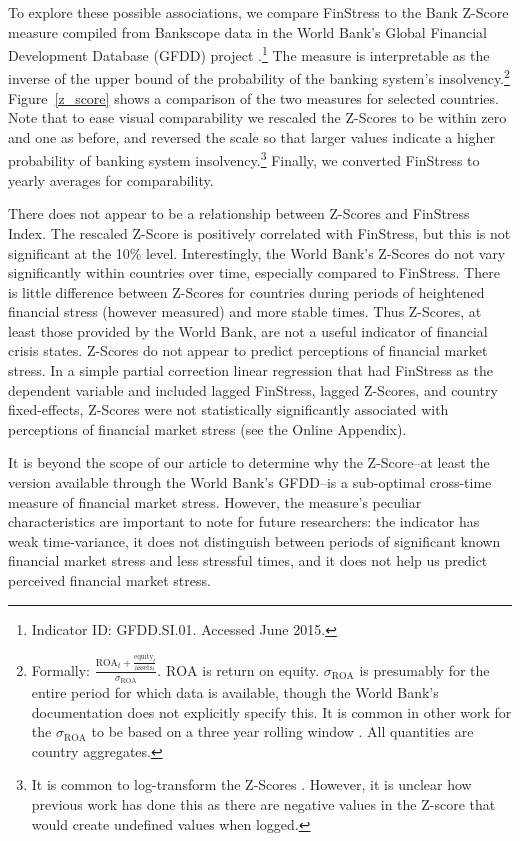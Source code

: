 \documentclass[]{article}
\begin{document}
To explore these possible associations, we compare FinStress to the Bank Z-Score measure compiled from Bankscope data in the World Bank's Global Financial Development Database (GFDD) project \citep{worldbank2013}.\footnote{Indicator ID: GFDD.SI.01. Accessed June 2015.} The measure is interpretable as the inverse of the upper bound of the probability of the banking system's insolvency.\footnote{Formally: $\frac{\mathrm{ROA}_{t} + \frac{\mathrm{equity}_{t}}{\mathrm{assets}_{t}}}{\sigma_{\mathrm{ROA}}}$. $\mathrm{ROA}$ is return on equity. $\sigma_{\mathrm{ROA}}$ is presumably for the entire period for which data is available, though the World Bank's documentation does not explicitly specify this. It is common in other work for the $\sigma_{\mathrm{ROA}}$ to be based on a three year rolling window \cite[225]{beck2013bank}. All quantities are country aggregates.} Figure~\ref{z_score} shows a comparison of the two measures for selected countries. Note that to ease visual comparability we rescaled the Z-Scores to be within zero and one as before, and reversed the scale so that larger values indicate a higher probability of banking system insolvency.\footnote{It is common to log-transform the Z-Scores \cite[225]{beck2013bank}. However, it is unclear how previous work has done this as there are negative values in the Z-score that would create undefined values when logged.} Finally, we converted FinStress to yearly averages for comparability.

There does not appear to be a relationship between Z-Scores and FinStress Index. The rescaled Z-Score is positively correlated with FinStress, but this is not significant at the 10\% level. Interestingly, the World Bank's Z-Scores do not vary significantly within countries over time, especially compared to  FinStress. There is little difference between Z-Scores for countries during periods of heightened financial stress (however measured) and more stable times. Thus Z-Scores, at least those provided by the World Bank, are not a useful indicator of financial crisis states. Z-Scores do not appear to predict perceptions of financial market stress. In a simple partial correction linear regression that had FinStress as the dependent variable and included lagged FinStress, lagged Z-Scores, and country fixed-effects, Z-Scores were not statistically significantly associated with perceptions of financial market stress (see the Online Appendix).

It is beyond the scope of our article to determine why the Z-Score--at least the version available through the World Bank's GFDD--is a sub-optimal cross-time measure of financial market stress. However, the measure's peculiar characteristics are important to note for future researchers: the indicator has weak time-variance, it does not distinguish between periods of significant known financial market stress and less stressful times, and it does not help us predict perceived financial market stress.
\end{document}
